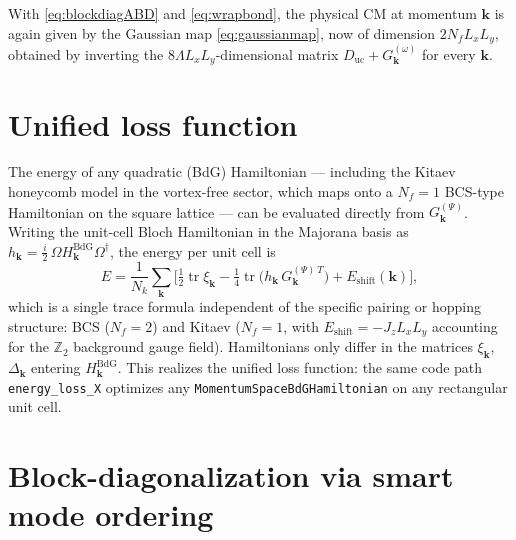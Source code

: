 \documentclass[11pt,a4paper]{article}
\newcommand{\uc}{\mathrm{uc}}
\begin{document}
With \eqref{eq:blockdiagABD} and \eqref{eq:wrapbond}, the physical CM at
momentum $\bm k$ is again given by the Gaussian map
\eqref{eq:gaussianmap}, now of dimension $2 N_f L_x L_y$, obtained by
inverting the $8\Lambda L_x L_y$-dimensional matrix
$D_{\uc} + G^{(\omega)}_{\bm k}$ for every $\bm k$.

\section{Unified loss function}

The energy of any quadratic (BdG) Hamiltonian --- including the Kitaev
honeycomb model in the vortex-free sector, which maps onto a
$N_f = 1$ BCS-type Hamiltonian on the square lattice --- can be evaluated
directly from $G^{(\Psi)}_{\bm k}$. Writing the unit-cell Bloch Hamiltonian
in the Majorana basis as $h_{\bm k} = \tfrac{i}{2}\, \Omega H^{\mathrm{BdG}}_{\bm k} \Omega^\dagger$,
the energy per unit cell is
\begin{equation}
  E = \frac{1}{N_k} \sum_{\bm k} \Big[
      \tfrac12 \operatorname{tr} \xi_{\bm k}
      - \tfrac14 \operatorname{tr}\!\big( h_{\bm k}\, G^{(\Psi)\,T}_{\bm k} \big)
      + E_{\mathrm{shift}}(\bm k) \Big],
  \label{eq:loss}
\end{equation}
which is a single trace formula independent of the specific pairing or
hopping structure: BCS ($N_f = 2$) and Kitaev ($N_f = 1$, with
$E_{\mathrm{shift}} = -J_z L_x L_y$ accounting for the $\mathbb{Z}_2$ background gauge field). 
Hamiltonians only differ in the matrices $\xi_{\bm k}$, $\Delta_{\bm k}$ entering $H^{\mathrm{BdG}}_{\bm k}$. This
realizes the unified loss function: the same code path
\texttt{energy\_loss\_X} optimizes any \texttt{MomentumSpaceBdGHamiltonian}
on any rectangular unit cell.

\section{Block-diagonalization via smart mode ordering}
\label{sec:blockdiag}
\end{document}
